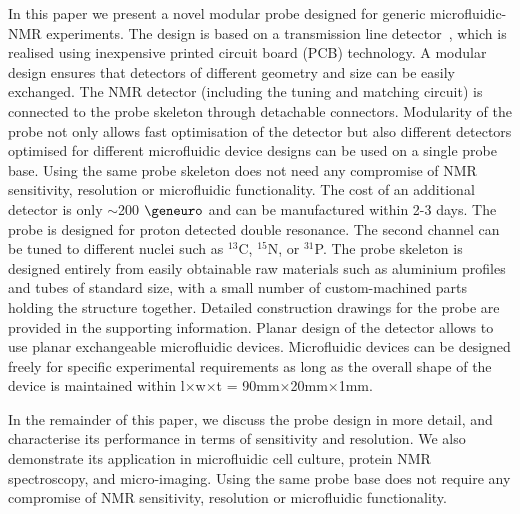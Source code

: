 \documentclass[preprint,12pt]{article}
\begin{document}
In this paper we present a novel modular probe designed for generic microfluidic-NMR experiments. The design is based on a transmission line detector~\cite{stripline_jan,gream_2016}, which is realised using inexpensive printed circuit board (PCB) technology. A modular design ensures that detectors of different geometry and size can be easily exchanged. The NMR detector (including the tuning and matching circuit) is connected to the probe skeleton through detachable connectors. Modularity of the probe not only allows fast optimisation of the detector but also different detectors optimised for different microfluidic device designs can be used on a single probe base. Using the same probe skeleton does not need any compromise of NMR sensitivity, resolution or microfluidic functionality. The cost of an additional detector is only $\sim$200 $\geneuro$ and can be manufactured within 2-3 days. The probe is designed for proton detected double resonance. The second channel can be tuned to different nuclei such as $^{13}$C, $^{15}$N, or $^{31}$P. The probe skeleton is designed entirely from easily obtainable raw materials such as aluminium profiles and tubes of standard size, with a small number of custom-machined parts holding the structure together. Detailed construction drawings for the probe are provided in the supporting information. Planar design of the detector allows to use planar exchangeable microfluidic devices. Microfluidic devices can be designed freely for specific experimental requirements as long as the overall shape of the device is maintained within l$\times$w$\times$t = 90mm$\times$20mm$\times$1mm.\par
In the remainder of this paper, we discuss the probe design in more detail, and characterise its performance in terms of sensitivity and resolution. We also demonstrate its application in microfluidic cell culture, protein NMR spectroscopy, and micro-imaging. Using the same probe base does not require any compromise of NMR sensitivity, resolution or microfluidic functionality.
\end{document}
